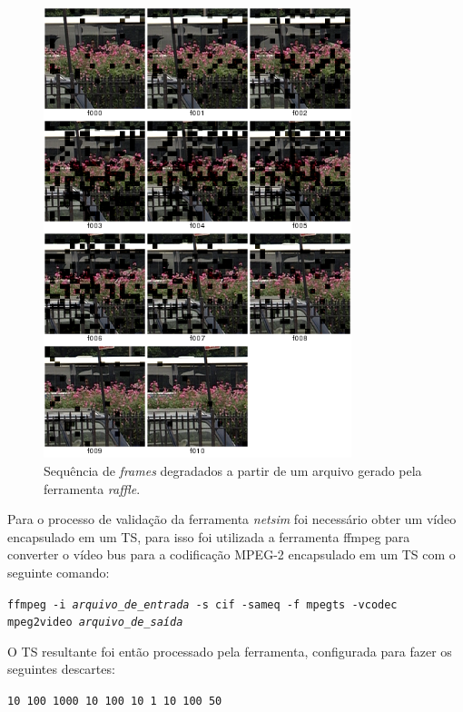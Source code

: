 \begin{figure}[!htb]
	\centering
	\includegraphics[width=0.8\textwidth]{./imgs/busraffle.png}
	\caption[Sequência de \emph{frames} degradados]{Sequência de \emph{frames} degradados a partir de um arquivo gerado pela ferramenta \emph{raffle}.}
	\label{fig:busraffle}
\end{figure}

Para o processo de validação da ferramenta \emph{netsim} foi necessário obter um vídeo encapsulado em um TS, para isso foi utilizada a ferramenta ffmpeg para converter o vídeo bus para a codificação MPEG-2 encapsulado em um TS com o seguinte comando:

{
	\centering
	\texttt{ffmpeg -i \emph{arquivo\_de\_entrada} -s cif -sameq -f mpegts -vcodec mpeg2video \emph{arquivo\_de\_saída}}
}

O TS resultante foi então processado pela ferramenta, configurada para fazer os seguintes descartes:

\begin{center}
	\texttt{10 100
	1000 10
	100 10
	1 10
	100 50}
\end{center}


